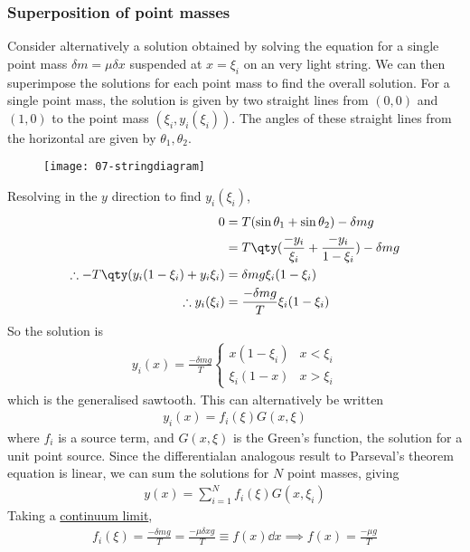 \subsubsection{Superposition of point masses}
Consider alternatively a solution obtained by solving the equation for a single point mass $\delta m = \mu \delta x$ suspended at $x = \xi_i$ on an very light string.
We can then superimpose the solutions for each point mass to find the overall solution.
For a single point mass, the solution is given by two straight lines from $(0,0)$ and $(1,0)$ to the point mass $(\xi_i, y_i(\xi_i))$.
The angles of these straight lines from the horizontal are given by $\theta_1, \theta_2$.
\begin{figure}[h] 
    \centering 
    \texttt{[image: 07-stringdiagram]} 
\end{figure}
Resolving in the $y$ direction to find $y_i(\xi_i)$,
\begin{align*}
	0 & = T (\sin \theta_1 + \sin \theta_2) - \delta m g \\
	& = T\qty(\frac{-y_i}{\xi_i} + \frac{-y_i}{1-\xi_i}) - \delta m g \\
	\therefore -T\qty(y_i(1-\xi_i) + y_i \xi_i) & = \delta m g \xi_i(1-\xi_i) \\
	\therefore y_i(\xi_i) & = \frac{-\delta m g}{T} \xi_i (1-\xi_i)
\end{align*}
So the solution is
\begin{align*}
	y_i(x) = \frac{-\delta m g}{T} \begin{cases}
		x(1-\xi_i)    & x < \xi_i \\
		\xi_i (1 - x) & x > \xi_i
	\end{cases}
\end{align*}
which is the generalised sawtooth.
This can alternatively be written
\begin{align} \label{eq:7.4}
	y_i(x) = f_i(\xi) G(x,\xi)
\end{align}
where $f_i$ is a source term, and $G(x,\xi)$ is the Green's function, the solution for a unit point source.
Since the differentialan analogous result to Parseval’s theorem equation is linear, we can sum the solutions for $N$ point masses, giving
\begin{align*}
	y(x) = \sum_{i=1}^N f_i(\xi) G(x, \xi_i)
\end{align*}
Taking a \underline{continuum limit},
\begin{align*}
	f_i(\xi) = \frac{-\delta m g}{T} = \frac{-\mu \delta x g}{T} \equiv f(x) \dd{x} \implies f(x) = \frac{-\mu g}{T}
\end{align*}
